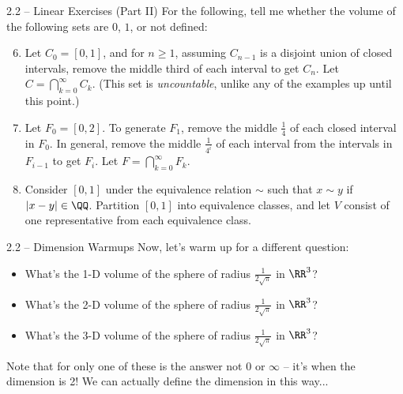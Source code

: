 \documentclass{beamer}
\theoremstyle{plain}
\begin{document}
\begin{frame}{2.2 -- Linear Exercises (Part II)}
  For the following, tell me whether the volume of the following sets are $0$,
  $1$, or not defined: 
 
  \begin{enumerate}
    \setcounter{enumi}{5}
  \pause
  \item Let $C_0 = [0,1]$, and
    for $n \geq 1$, assuming $C_{n-1}$ is a disjoint union of closed intervals, 
    remove the middle third of each interval to get $C_n$. Let $C = \bigcap_{k=0}^\infty
    C_k$. (This set is \textit{uncountable},
    unlike any of the examples up until this point.)
\pause
  \item Let $F_0 =
    [0,2]$. To generate $F_1$, remove the middle $\frac{1}{4}$ of each closed
    interval in $F_0$. In general, remove the
    middle $\frac{1}{4^i}$ of each interval from the intervals in $F_{i-1}$
    to get $F_i$. Let $F = \bigcap_{k=0}^\infty F_k$. 
\pause
  \item Consider $[0,1]$ under the equivalence relation $\sim$ such that $x \sim
    y$ if $|x - y| \in \QQ$. Partition $[0,1]$ into equivalence classes, and let
    $V$ consist of one representative from each equivalence class.
  \end{enumerate}
\end{frame}

\begin{frame}{2.2 -- Dimension Warmups}
  Now, let's warm up for a different question:
   \begin{itemize}
      \pause\item What's the 1-D volume of the sphere of radius
        $\frac{1}{2\sqrt \pi}$ in $\RR^3$?
      \pause\item What's the 2-D volume of the sphere of radius
        $\frac{1}{2\sqrt \pi}$ in $\RR^3$?
      \pause\item What's the 3-D volume of the sphere of radius
        $\frac{1}{2\sqrt \pi}$ in $\RR^3$? 
   \end{itemize}
   \pause
  Note that for only one of these is the answer not $0$ or $\infty$ -- it's when
  the dimension is 2! We can actually define the dimension in this way...
\end{frame}
\end{document}
